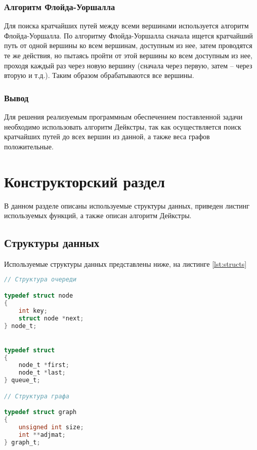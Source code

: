 \subsection{Алгоритм Флойда-Уоршалла}

Для поиска кратчайших путей между всеми вершинами используется алгоритм
Флойда-Уоршалла. По алгоритму Флойда-Уоршалла сначала ищется кратчайший
путь от одной вершины ко всем вершинам, доступным из нее, затем проводятся те же
действия, но пытаясь пройти от этой вершины ко всем доступным из нее, проходя
каждый раз через новую вершину (сначала через первую, затем – через вторую и
т.д.). Таким образом обрабатываются все вершины.

\subsection{Вывод}

Для решения реализуемым программным обеспечением поставленной задачи необходимо использовать алгоритм Дейкстры, так как осуществляется поиск кратчайших путей до всех вершин из данной, а также веса графов положительные.

\chapter{Конструкторский раздел}

В данном разделе описаны используемые структуры данных, приведен листинг используемых функций, а также описан алгоритм Дейкстры.

\section{Структуры данных}

Используемые структуры данных представлены ниже, на листинге \ref{lst:structs}

\begin{lstlisting}[language=C,caption=Используемые структуры данных,label=lst:structs]
// Структура очереди

typedef struct node
{
    int key;
    struct node *next;
} node_t;


typedef struct
{
    node_t *first;
    node_t *last;
} queue_t;

// Структура графа

typedef struct graph
{
    unsigned int size;
    int **adjmat;
} graph_t;

\end{lstlisting}

